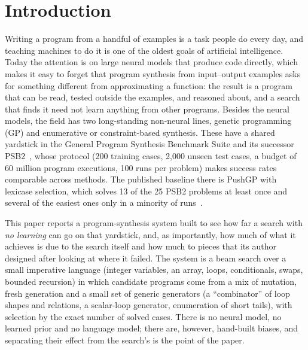 \documentclass[sigconf,nonacm]{acmart}
\begin{document}
\maketitle

\section{Introduction}

Writing a program from a handful of examples is a task people do every day, and teaching machines to do it is one of the oldest goals
of artificial intelligence. Today the attention is on large neural models that produce code directly, which makes it easy to forget that
program synthesis from input--output examples asks for something different from approximating a function: the result is a program that can
be read, tested outside the examples, and reasoned about, and a search that finds it need not learn anything from other programs. Besides the neural models, the field has two long-standing non-neural
lines, genetic programming (GP) and enumerative or constraint-based synthesis. These have a
shared yardstick in the General Program Synthesis Benchmark Suite and its successor PSB2~\cite{helmuth2015psb1,helmuth2021psb2},
whose protocol (200 training cases, 2,000 unseen test cases, a budget of 60 million program executions, 100 runs per problem) makes
success rates comparable across methods. The published baseline there is PushGP with lexicase selection, which solves 13 of the 25
PSB2 problems at least once and several of the easiest ones only in a minority of runs~\cite{helmuth2021psb2}.

This paper reports a program-synthesis system built to see how far a search with \emph{no learning} can go on that yardstick, and,
as importantly, how much of what it achieves is due to the search itself and how much to pieces that its author designed after
looking at where it failed. The system is a beam search over a small imperative language (integer variables, an array, loops,
conditionals, swaps, bounded recursion) in which candidate programs come from a mix of mutation, fresh generation and a small
set of generic generators (a ``combinator'' of loop shapes and relations, a scalar-loop generator, enumeration of short tails),
with selection by the exact number of solved cases. There is no neural model, no learned prior and no language model; there are, however, hand-built biases, and separating their effect from the search's is the point of the paper.
\end{document}
